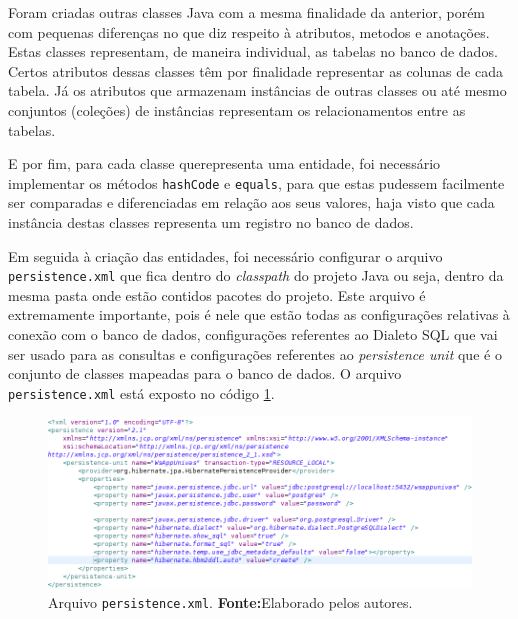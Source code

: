 		\par Foram criadas outras classes Java com a mesma finalidade da
	anterior, porém com pequenas diferenças no que diz respeito à atributos,
	metodos e anotações. Estas classes representam, de maneira individual, as
	tabelas no banco de dados. Certos atributos dessas classes têm por finalidade
	representar as colunas de cada tabela. Já os atributos que armazenam instâncias
	de outras classes ou até mesmo conjuntos (coleções) de instâncias representam os
	relacionamentos entre as tabelas. 
	
		\par E por fim, para cada classe querepresenta uma 	entidade, foi necessário
	implementar os métodos \texttt{hashCode} e \texttt{equals}, para que estas
	pudessem facilmente ser comparadas e diferenciadas em relação aos seus
	valores, haja visto que cada instância destas classes representa um registro
	no banco de dados.
		
		\par Em seguida à criação das entidades, foi necessário configurar o arquivo
	\texttt{persistence.xml} que fica dentro do \textit{classpath} do projeto
	Java ou seja, dentro da mesma pasta onde estão contidos pacotes do
	projeto. Este arquivo é extremamente importante, pois é nele que estão todas
	as configurações relativas à conexão com o banco de dados, configurações
	referentes ao Dialeto SQL que vai ser usado para as consultas e configurações
	referentes ao \textit{persistence unit} que é o conjunto de classes mapeadas
	para o banco de dados.	O arquivo \texttt{persistence.xml} está exposto no
	código \ref{fig:qm11}.
	
 		\begin{figure}[h!]
			\centerline{\includegraphics[scale=0.6]{./imagens/2_q_metodologico/qm11.png}}
			\caption[Arquivo \texttt{persistence.xml}]{Arquivo \texttt{persistence.xml}.
			\textbf{Fonte:}Elaborado pelos autores.}
			\label{fig:qm11}
		\end{figure}
		
